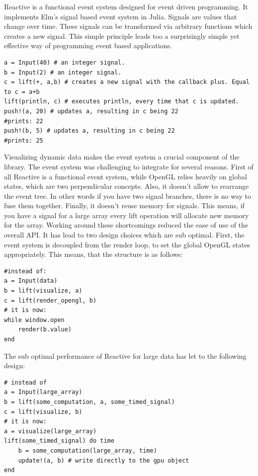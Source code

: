 Reactive is a functional event system designed for event driven programming.
It implements Elm's signal based event system in Julia.
Signals are values that change over time.
These signals can be transformed via arbitrary functions which creates a new signal. 
This simple principle leads too a surprisingly simple yet effective way of programming event based applications.
\begin{lstlisting}
a = Input(40) # an integer signal.
b = Input(2) # an integer signal.
c = lift(+, a,b) # creates a new signal with the callback plus. Equal to c = a+b
lift(println, c) # executes println, every time that c is updated. 
push!(a, 20) # updates a, resulting in c being 22
#prints: 22
push!(b, 5) # updates a, resulting in c being 22
#prints: 25
\end{lstlisting}
Visualizing dynamic data makes the event system a crucial component of the library.
The event system was challenging to integrate for several reasons.
First of all Reactive is a functional event system, while OpenGL relies heavily on global states, which are two perpendicular concepts.
Also, it doesn't allow to rearrange the event tree. In other words if you have two signal branches, there is no way to fuse them together.
Finally, it doesn't reuse memory for signals. This means, if you have a signal for a large array every lift operation will allocate new memory for the array.
Working around these shortcomings reduced the ease of use of the overall API.
It has lead to two design choices which are sub optimal.
First, the event system is decoupled from the render loop, to set the global OpenGL states appropriately.
This means, that the structure is as follows:
\begin{lstlisting}
#instead of:
a = Input(data)
b = lift(visualize, a)
c = lift(render_opengl, b)
# it is now:
while window.open
	render(b.value)
end
\end{lstlisting}
The sub optimal performance of Reactive for large data has let to the following design:
\begin{lstlisting}
# instead of
a = Input(large_array)
b = lift(some_computation, a, some_timed_signal)
c = lift(visualize, b)
# it is now:
a = visualize(large_array)
lift(some_timed_signal) do time
	b = some_computation(large_array, time)
	update!(a, b) # write directly to the gpu object
end
\end{lstlisting}


